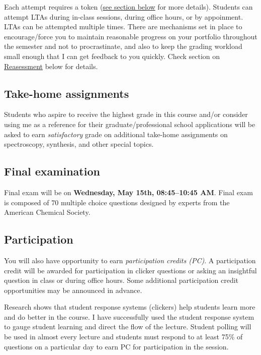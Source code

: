 Each attempt requires a token (\protect\hyperlink{tokens}{see section
below} for more details). Students can attempt LTAs during in-class
sessions, during office hours, or by appoinment. LTAs can be attempted
multiple times. There are mechanisms set in place to encourage/force you
to maintain reasonable progress on your portfolio throughout the
semester and not to procrastinate, and also to keep the grading workload
small enough that I can get feedback to you quickly. Check section on
\protect\hyperlink{revisions}{Reasessment} below for details.

\hypertarget{take-home-assignments}{%
\subsection{Take-home assignments}\label{take-home-assignments}}

Students who aspire to receive the highest grade in this course and/or
consider using me as a reference for their graduate/professional school
applications will be asked to earn \emph{satisfactory} grade on
additional take-home assignments on spectroscopy, synthesis, and other
special topics.

\hypertarget{final-examination}{%
\subsection{Final examination}\label{final-examination}}

Final exam will be on \textbf{Wednesday, May 15th, 08:45--10:45 AM}.
Final exam is composed of 70 multiple choice questions designed by
experts from the American Chemical Society.

\hypertarget{participation}{%
\subsection{Participation}\label{participation}}

You will also have opportunity to earn \emph{participation credits
(PC)}. A participation credit will be awarded for participation in
clicker questions or asking an insightful question in class or during
office hours. Some additional participation credit opportunities may be
announced in advance.

Research shows that student response systems (clickers) help students
learn more and do better in the course. I have successfully used the
student response system to gauge student learning and direct the flow of
the lecture. Student polling will be used in almost every lecture and
students must respond to at least 75\% of questions on a particular day
to earn PC for participation in the session.

